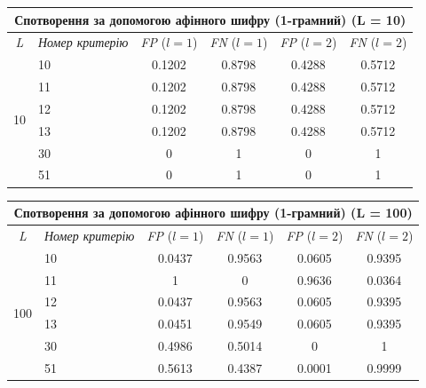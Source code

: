 \documentclass[a4paper,12pt]{article}
\begin{document}
\begin{center}
\renewcommand{\arraystretch}{1.2}
\setlength{\tabcolsep}{6pt}
\begin{tabular}{|c|l||c|c||c|c|}
\hline
\multicolumn{6}{|c|}{Спотворення за допомогою афінного шифру (1-грамний) (L = 10)} \\
\hline
\textit{L} & \textit{Номер критерію} & \textit{FP} ($l=1$) & \textit{FN} ($l=1$) & \textit{FP} ($l=2$) & \textit{FN} ($l=2$) \\
\hline
\multirow{6}{*}{10} & 10 & 0.1202 & 0.8798 & 0.4288 & 0.5712 \\
 & 11 & 0.1202 & 0.8798 & 0.4288 & 0.5712 \\
 & 12 & 0.1202 & 0.8798 & 0.4288 & 0.5712 \\
 & 13 & 0.1202 & 0.8798 & 0.4288 & 0.5712 \\
 & 30 & 0 & 1 & 0 & 1 \\
 & 51 & 0 & 1 & 0 & 1 \\
\hline
\end{tabular}
\end{center}

\begin{center}
\renewcommand{\arraystretch}{1.2}
\setlength{\tabcolsep}{6pt}
\begin{tabular}{|c|l||c|c||c|c|}
\hline
\multicolumn{6}{|c|}{Спотворення за допомогою афінного шифру (1-грамний) (L = 100)} \\
\hline
\textit{L} & \textit{Номер критерію} & \textit{FP} ($l=1$) & \textit{FN} ($l=1$) & \textit{FP} ($l=2$) & \textit{FN} ($l=2$) \\
\hline
\multirow{6}{*}{100} & 10 & 0.0437 & 0.9563 & 0.0605 & 0.9395 \\
 & 11 & 1 & 0 & 0.9636 & 0.0364 \\
 & 12 & 0.0437 & 0.9563 & 0.0605 & 0.9395 \\
 & 13 & 0.0451 & 0.9549 & 0.0605 & 0.9395 \\
 & 30 & 0.4986 & 0.5014 & 0 & 1 \\
 & 51 & 0.5613 & 0.4387 & 0.0001 & 0.9999 \\
\hline
\end{tabular}
\end{center}
\end{document}
